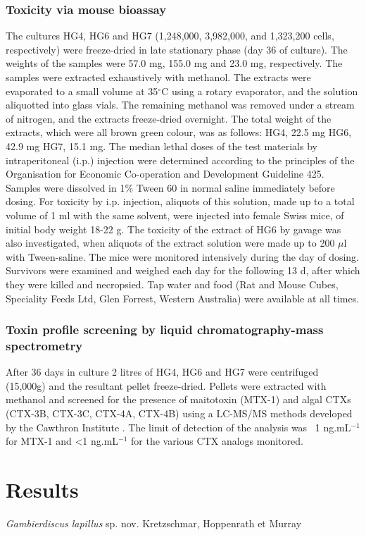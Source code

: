 \documentclass[12pt]{article}
\begin{document}
\subsubsection{Toxicity via mouse bioassay}
The cultures HG4, HG6 and HG7 (1,248,000, 3,982,000, and 1,323,200 cells, respectively) were freeze-dried in late stationary phase (day 36 of culture). 
The weights of the samples were 57.0 mg, 155.0 mg and 23.0 mg, respectively. 
The samples were extracted exhaustively with methanol. 
The extracts were evaporated to a small volume at 35$^{\circ}$C using a rotary evaporator, and the solution aliquotted into glass vials. 
The remaining methanol was removed under a stream of nitrogen, and the extracts freeze-dried overnight. 
The total weight of the extracts, which were all brown green colour, was as follows: HG4, 22.5 mg HG6, 42.9 mg HG7, 15.1 mg. 
The median lethal doses of the test materials by intraperitoneal (i.p.) injection were determined according to the principles of the Organisation for Economic Co-operation and Development Guideline 425. 
Samples were dissolved in 1\% Tween 60 in normal saline immediately before dosing. 
For toxicity by i.p. injection, aliquots of this solution, made up to a total volume of 1 ml with the same solvent, were injected into female Swiss mice, of initial body weight 18-22 g. 
The toxicity of the extract of HG6 by gavage was also investigated, when aliquots of the extract solution were made up to 200 $\mu$l with Tween-saline. 
The mice were monitored intensively during the day of dosing. 
Survivors were examined and weighed each day for the following 13 d, after which they were killed and necropsied. 
Tap water and food (Rat and Mouse Cubes, Speciality Feeds Ltd, Glen Forrest, Western Australia) were available at all times.\\

\subsubsection{Toxin profile screening by liquid chromatography-mass spectrometry}
After 36 days in culture 2 litres of HG4, HG6 and HG7 were centrifuged (15,000g) and the resultant pellet freeze-dried. 
Pellets were extracted with methanol and screened for the presence of maitotoxin (MTX-1) and algal CTXs (CTX-3B, CTX-3C, CTX-4A, CTX-4B) using a LC-MS/MS methods developed by the Cawthron Institute \citep{kohli2014feeding}.
The limit of detection of the analysis was ~1 ng.mL$^{-1}$ for MTX-1 and <1 ng.mL$^{-1}$ for the various CTX analogs monitored.
\newpage
\section{Results}
\textit{Gambierdiscus lapillus} sp. nov. Kretzschmar, Hoppenrath et Murray
\end{document}

